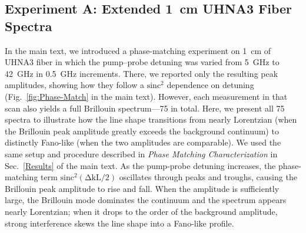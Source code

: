 \subsection{Experiment A: Extended \SI{1}{\centi\meter} UHNA3 Fiber Spectra}
\label{Appendix:Fano:Experiment A}

In the main text, we introduced a phase-matching experiment on \SI{1}{\centi\meter} of UHNA3 fiber in which the pump--probe detuning was varied from \SI{5}{\giga\hertz} to \SI{42}{\giga\hertz} in \SI{0.5}{\giga\hertz} increments. There, we reported only the resulting peak amplitudes, showing how they follow a \(\mathrm{sinc^{2}}\) dependence on detuning (Fig.~\ref{fig:Phase-Match} in the main text). However, each measurement in that scan also yields a full Brillouin spectrum—75 in total. Here, we present all 75 spectra to illustrate how the line shape transitions from nearly Lorentzian (when the Brillouin peak amplitude greatly exceeds the background continuum) to distinctly Fano-like (when the two amplitudes are comparable). We used the same setup and procedure described in \textit{Phase Matching Characterization} in Sec.~\ref{Results} of the main text. As the pump-probe detuning increases, the phase-matching term \(\mathrm{sinc^{2}(\Delta kL/2)}\) oscillates through peaks and troughs, causing the Brillouin peak amplitude to rise and fall. When the amplitude is sufficiently large, the Brillouin mode dominates the continuum and the spectrum appears nearly Lorentzian; when it drops to the order of the background amplitude, strong interference skews the line shape into a Fano-like profile.


